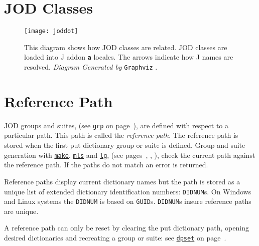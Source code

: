      
   \newpage
   \section{JOD Classes}\label{ap:classes}
   
   \begin{figure}[htbp]
  \centering
  \texttt{[image: joddot]}
  \caption[JOD Classes]{This diagram shows how 
    JOD classes are related. JOD classes are loaded into 
    J addon \textbf{\texttt{a}} locales. The arrows indicate how J names are resolved. \emph{Diagram Generated by} \texttt{Graphviz} \cite{jwiki:graphviz}.    
    }
   \label{eps:joddot}
   \end{figure}
   
   \newpage
   \section{Reference Path}\label{ap:refpath}
   
   JOD groups and suites, (see \hyperlink{il:grp}{\texttt{grp}} on page~\pageref{ss:grp}), are defined with respect to a particular path.  This path is called the \emph{reference path}.  The reference path is stored when the first put dictionary group or 
suite is defined.   Group and suite generation with \hyperlink{il:make}{\texttt{make}}, \hyperlink{il:mls}{\texttt{mls}} and  \hyperlink{il:lg}{\texttt{lg}}, (see pages~\pageref{ss:make}, \pageref{ss:mls}, \pageref{ss:lg}), check the current path against the reference path.  If the paths do not match an error is returned.

Reference paths display current dictionary names but the path is 
stored as a unique list of extended dictionary 
identification numbers: \texttt{DIDNUM}s.  On Windows and Linux 
systems the \texttt{DIDNUM} is based 
on \texttt{GUID}s.  \texttt{DIDNUM}s insure reference paths are unique.


A reference path can only be reset by clearing the put dictionary
 path, opening desired dictionaries and recreating a group or suite: see \hyperlink{il:dpset}{\texttt{dpset}} on page~\pageref{ss:dpset}.

